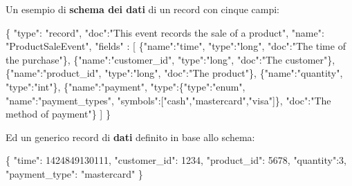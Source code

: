 \documentclass[]{article}
\newenvironment{Shaded}{}{}
\newcommand{\DataTypeTok}[1]{\textcolor[rgb]{0.56,0.13,0.00}{#1}}
\newcommand{\DecValTok}[1]{\textcolor[rgb]{0.25,0.63,0.44}{#1}}
\newcommand{\StringTok}[1]{\textcolor[rgb]{0.25,0.44,0.63}{#1}}
\newcommand{\OtherTok}[1]{\textcolor[rgb]{0.00,0.44,0.13}{#1}}
\newcommand{\FunctionTok}[1]{\textcolor[rgb]{0.02,0.16,0.49}{#1}}
\begin{document}
Un esempio di \textbf{schema dei dati} di un record con cinque campi:
\small

\begin{Shaded}
\begin{Highlighting}[]
\FunctionTok{\{}
  \DataTypeTok{"type"}\FunctionTok{:} \StringTok{"record"}\FunctionTok{,}
  \DataTypeTok{"doc"}\FunctionTok{:}\StringTok{"This event records the sale of a product"}\FunctionTok{,}
  \DataTypeTok{"name"}\FunctionTok{:} \StringTok{"ProductSaleEvent"}\FunctionTok{,}
  \DataTypeTok{"fields"} \FunctionTok{:} \OtherTok{[}
    \FunctionTok{\{}\DataTypeTok{"name"}\FunctionTok{:}\StringTok{"time"}\FunctionTok{,} \DataTypeTok{"type"}\FunctionTok{:}\StringTok{"long"}\FunctionTok{,} \DataTypeTok{"doc"}\FunctionTok{:}\StringTok{"The time of the purchase"}\FunctionTok{\}}\OtherTok{,}
    \FunctionTok{\{}\DataTypeTok{"name"}\FunctionTok{:}\StringTok{"customer_id"}\FunctionTok{,} \DataTypeTok{"type"}\FunctionTok{:}\StringTok{"long"}\FunctionTok{,} \DataTypeTok{"doc"}\FunctionTok{:}\StringTok{"The customer"}\FunctionTok{\}}\OtherTok{,}
    \FunctionTok{\{}\DataTypeTok{"name"}\FunctionTok{:}\StringTok{"product_id"}\FunctionTok{,} \DataTypeTok{"type"}\FunctionTok{:}\StringTok{"long"}\FunctionTok{,} \DataTypeTok{"doc"}\FunctionTok{:}\StringTok{"The product"}\FunctionTok{\}}\OtherTok{,}
    \FunctionTok{\{}\DataTypeTok{"name"}\FunctionTok{:}\StringTok{"quantity"}\FunctionTok{,} \DataTypeTok{"type"}\FunctionTok{:}\StringTok{"int"}\FunctionTok{\}}\OtherTok{,}
    \FunctionTok{\{}\DataTypeTok{"name"}\FunctionTok{:}\StringTok{"payment"}\FunctionTok{,}
     \DataTypeTok{"type"}\FunctionTok{:\{}\DataTypeTok{"type"}\FunctionTok{:}\StringTok{"enum"}\FunctionTok{,}
         \DataTypeTok{"name"}\FunctionTok{:}\StringTok{"payment_types"}\FunctionTok{,}
             \DataTypeTok{"symbols"}\FunctionTok{:}\OtherTok{[}\StringTok{"cash"}\OtherTok{,}\StringTok{"mastercard"}\OtherTok{,}\StringTok{"visa"}\OtherTok{]}\FunctionTok{\},}
     \DataTypeTok{"doc"}\FunctionTok{:}\StringTok{"The method of payment"}\FunctionTok{\}}
  \OtherTok{]}
\FunctionTok{\}}
\end{Highlighting}
\end{Shaded}

\normalsize
\newpage
Ed un generico record di \textbf{dati} definito in base allo schema:

\small

\begin{Shaded}
\begin{Highlighting}[]
\FunctionTok{\{}  
  \DataTypeTok{"time"}\FunctionTok{:} \DecValTok{1424849130111}\FunctionTok{,}     
  \DataTypeTok{"customer_id"}\FunctionTok{:} \DecValTok{1234}\FunctionTok{,}  
  \DataTypeTok{"product_id"}\FunctionTok{:} \DecValTok{5678}\FunctionTok{,}  
  \DataTypeTok{"quantity"}\FunctionTok{:}\DecValTok{3}\FunctionTok{,}  
  \DataTypeTok{"payment_type"}\FunctionTok{:} \StringTok{"mastercard"}  
\FunctionTok{\}}
\end{Highlighting}
\end{Shaded}
\end{document}

